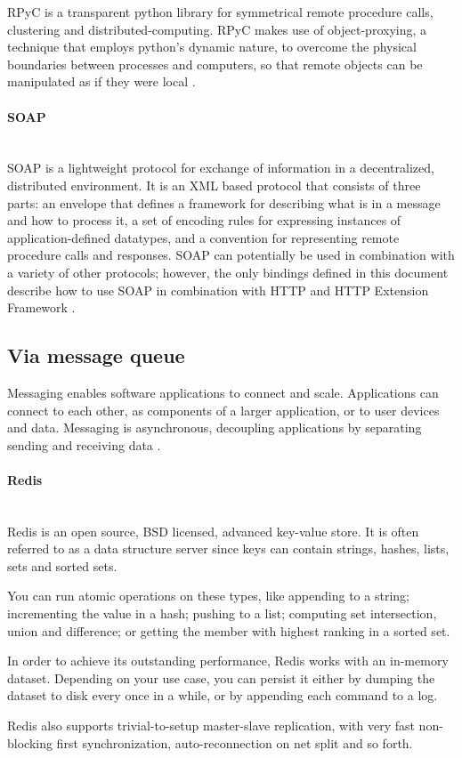 \documentclass[thesis=B,english]{FITthesis}[2013/04/26]
\newcommand{\myparagraph}[1]{\paragraph{#1}\mbox{}\\}
\begin{document}
RPyC is a transparent python library for symmetrical remote procedure calls, clustering and distributed-computing. RPyC makes use of object-proxying, a technique that employs python’s dynamic nature, to overcome the physical boundaries between processes and computers, so that remote objects can be manipulated as if they were local \cite{rpyc}.

\myparagraph{SOAP}

SOAP is a lightweight protocol for exchange of information in a decentralized, distributed environment. It is an XML based protocol that consists of three parts: an envelope that defines a framework for describing what is in a message and how to process it, a set of encoding rules for expressing instances of application-defined datatypes, and a convention for representing remote procedure calls and responses. SOAP can potentially be used in combination with a variety of other protocols; however, the only bindings defined in this document describe how to use SOAP in combination with HTTP and HTTP Extension Framework \cite{soap}.

\subsection{Via message queue}

Messaging enables software applications to connect and scale. Applications can connect to each other, as components of a larger application, or to user devices and data. Messaging is asynchronous, decoupling applications by separating sending and receiving data \cite{rabbitmq_official}.

\myparagraph{Redis}

Redis is an open source, BSD licensed, advanced key-value store. It is often referred to as a data structure server since keys can contain strings, hashes, lists, sets and sorted sets.

You can run atomic operations on these types, like appending to a string; incrementing the value in a hash; pushing to a list; computing set intersection, union and difference; or getting the member with highest ranking in a sorted set.

In order to achieve its outstanding performance, Redis works with an in-memory dataset. Depending on your use case, you can persist it either by dumping the dataset to disk every once in a while, or by appending each command to a log.

Redis also supports trivial-to-setup master-slave replication, with very fast non-blocking first synchronization, auto-reconnection on net split and so forth.
\end{document}
